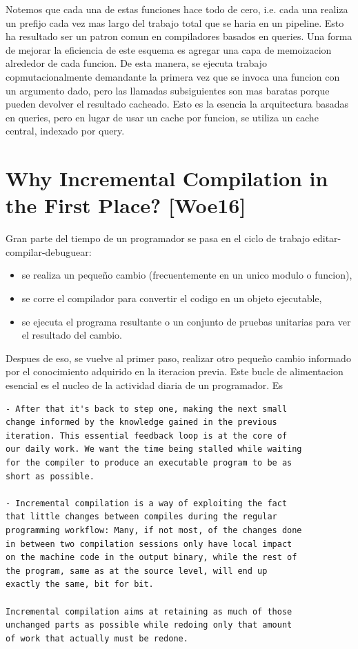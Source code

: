 \documentclass[12pt, a4paper]{report}
\begin{document}
Notemos que cada una de estas funciones hace todo de cero, i.e. cada una realiza un prefijo cada vez mas largo del trabajo total que se haria en un pipeline.
Esto ha resultado ser un patron comun en compiladores basados en queries.
Una forma de mejorar la eficiencia de este esquema es agregar una capa de memoizacion alrededor de cada funcion.
De esta manera, se ejecuta trabajo copmutacionalmente demandante la primera vez que se invoca una funcion con un argumento dado, pero las llamadas subsiguientes son mas baratas porque pueden devolver el resultado cacheado.
Esto es la esencia la arquitectura basadas en queries, pero en lugar de usar un cache por funcion, se utiliza un cache central, indexado por query.
\cite{olle_query_based}

\section*{Why Incremental Compilation in the First Place? [Woe16]}

Gran parte del tiempo de un programador se pasa en el ciclo de trabajo editar-compilar-debuguear:

\begin{itemize}
\item se realiza un pequeño cambio (frecuentemente en un unico modulo o funcion),
\item se corre el compilador para convertir el codigo en un objeto ejecutable,
\item se ejecuta el programa resultante o un conjunto de pruebas unitarias para ver el resultado del cambio.
\end{itemize}

Despues de eso, se vuelve al primer paso, realizar otro pequeño cambio informado por el conocimiento adquirido en la iteracion previa.
Este bucle de alimentacion esencial es el nucleo de la actividad diaria de un programador.
Es

\begin{verbatim}
- After that it's back to step one, making the next small
change informed by the knowledge gained in the previous
iteration. This essential feedback loop is at the core of
our daily work. We want the time being stalled while waiting
for the compiler to produce an executable program to be as
short as possible.

- Incremental compilation is a way of exploiting the fact
that little changes between compiles during the regular
programming workflow: Many, if not most, of the changes done
in between two compilation sessions only have local impact
on the machine code in the output binary, while the rest of
the program, same as at the source level, will end up
exactly the same, bit for bit.

Incremental compilation aims at retaining as much of those
unchanged parts as possible while redoing only that amount
of work that actually must be redone.
\end{verbatim}
\cite{rust_blog_incremental_compilation}
\end{document}
